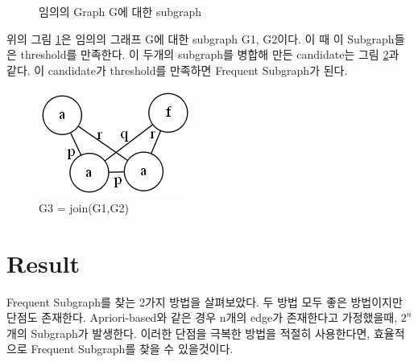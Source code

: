 \documentclass{oblivoir}
\begin{document}
				\begin{figure}[h]
					\centering
					\quad %
					\caption{임의의 Graph G에 대한 subgraph}
					\label{edge}
				\end{figure}
			
				위의 그림 \ref {edge}은 임의의 그래프 G에 대한 subgraph G1, G2이다. 이 때 이  Subgraph들은 threshold를 만족한다. 이 두개의 subgraph를 병합해 만든 candidate는 그림 \ref {edge_3}과 같다. 이 candidate가 threshold를 만족하면 Frequent Subgraph가 된다.
				
				\begin{figure}[h]
					\centering
					\includegraphics[width=.3\linewidth]{figure/edge.3}
					\caption{G3 = join(G1,G2)}
					\label{edge_3}
				\end{figure}
	\section{Result}
		Frequent Subgraph를 찾는 2가지 방법을 살펴보았다. 두 방법 모두 좋은 방법이지만 단점도 존재한다.	Apriori-based와 같은 경우 n개의 edge가 존재한다고 가정했을때, $2^n$개의 Subgraph가 발생한다. 이러한 단점을 극복한 방법을 적절히 사용한다면, 효율적으로 Frequent Subgraph를 찾을 수 있을것이다.
	
\end{document}
